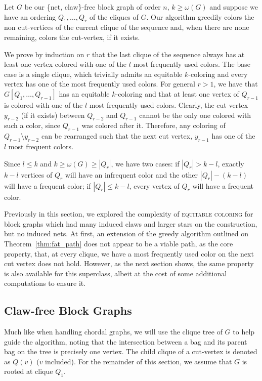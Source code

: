 \begin{tproof}
    Let $G$ be our \{net, claw\}-free block graph of order $n$, $k \geq \omega(G)$ and suppose we have an ordering $Q_1, \dots, Q_r$ of the cliques of $G$.
    Our algorithm greedily colors the non cut-vertices of the current clique of the sequence and, when there are none remaining, colors the cut-vertex, if it exists.
    
    We prove by induction on $r$ that the last clique of the sequence always has at least one vertex colored with one of the $l$ most frequently used colors.
    The base case is a single clique, which trivially admits an equitable $k$-coloring and every vertex has one of the most frequently used colors.
    For general $r > 1$, we have that $G[Q_1, \dots, Q_{r-1}]$ has an equitable $k$-coloring and that at least one vertex of $Q_{r-1}$ is colored with one of the $l$ most frequently used colors.
    Clearly, the cut vertex $y_{r-2}$ (if it exists) between $Q_{r-2}$ and $Q_{r-1}$ cannot be the only one colored with such a color, since $Q_{r-1}$ was colored after it.
    Therefore, any coloring of $Q_{r-1} \setminus y_{r-2}$ can be rearranged such that the next cut vertex, $y_{r-1}$ has one of the $l$ most frequent colors.
    
    Since $l \leq k$ and $k \geq \omega(G) \geq |Q_r|$, we have two cases: if $|Q_r| > k-l$, exactly $k-l$ vertices of $Q_r$ will have an infrequent color and the other $|Q_r| - (k-l)$ will have a frequent color; if $|Q_r| \leq k-l$, every vertex of $Q_r$ will have a frequent color.
\end{tproof}

Previously in this section, we explored the complexity of \textsc{equitable coloring} for block graphs which had many induced claws and larger stars on the construction, but no induced nets.
At first, an extension of the greedy algorithm outlined on Theorem~\ref{thm:fat_path} does not appear to be a viable path, as the core property, that, at every clique, we have a most frequently used color on the next cut vertex does not hold.
However, as the next section shows, the same property is also available for this superclass, albeit at the cost of some additional computations to ensure it.


\subsection{Claw-free Block Graphs}

Much like when handling chordal graphs, we will use the clique tree of $G$ to help guide the algorithm, noting that the intersection between a bag and its parent bag on the tree is precisely one vertex.
The child clique of a cut-vertex is denoted as $Q(v)$ ($v$ included).
For the remainder of this section, we assume that $G$ is rooted at clique $Q_1$.


